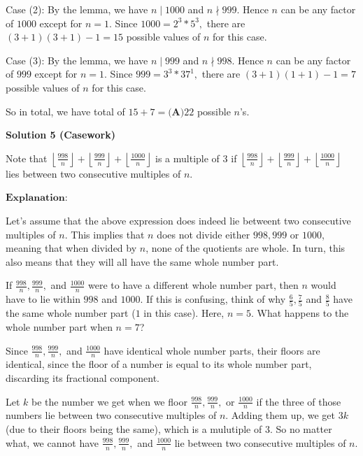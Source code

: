 \begin{enumerate}
 Case (2): By the lemma, we have $n \mid 1000$ and $n \nmid 999.$ Hence $n$ can be any factor of $1000$ except for $n = 1$. Since $1000 = 2^3 * 5^3,$ there are $(3+1)(3+1) - 1 = 15$ possible values of $n$ for this case.

 Case (3): By the lemma, we have $n \mid 999$ and $n \nmid 998.$ Hence $n$ can be any factor of $999$ except for $n = 1$. Since $999 = 3^3 * 37^1,$ there are $(3+1)(1+1) - 1 = 7$ possible values of $n$ for this case.

 So in total, we have total of $15+7=\boxed{\textbf{(A)}22}$ possible $n$'s.

 



\textbf{Solution 5 (Casework)}

Note that $\left\lfloor \frac{998}{n} \right\rfloor + \left\lfloor \frac{999}{n} \right\rfloor + \left\lfloor \frac{1000}{n} \right\rfloor$ is a multiple of $3$ if $\left\lfloor \frac{998}{n} \right\rfloor + \left\lfloor \frac{999}{n} \right\rfloor + \left\lfloor \frac{1000}{n} \right\rfloor$ lies between two consecutive multiples of $n$. 

 
$\textbf{Explanation:}$

 
Let's assume that the above expression does indeed lie betweent two consecutive multiples of $n$. This implies that $n$ does not divide either $998, 999$ or $1000$, meaning that when divided by $n$, none of the quotients are whole. In turn, this also means that they will all have the same whole number part. 

 
If $\frac{998}{n}, \frac{999}{n},$ and $\frac{1000}{n}$ were to have a different whole number part, then $n$ would have to lie within $998$ and $1000$. If this is confusing, think of why $\frac{6}{5}, \frac{7}{5}$ and $\frac{8}{5}$ have the same whole number part ($1$ in this case). Here, $n=5$. What happens to the whole number part when $n=7$? 

 
Since $\frac{998}{n}, \frac{999}{n},$ and $\frac{1000}{n}$ have identical whole number parts, their floors are identical, since the floor of a number is equal to its whole number part, discarding its fractional component. 

 
Let $k$ be the number we get when we floor $\frac{998}{n}, \frac{999}{n},$ or $\frac{1000}{n}$ if the three of those numbers lie between two consecutive multiples of $n$. Adding them up, we get $3k$ (due to their floors being the same), which is a mulutiple of $3$. So no matter what, we cannot have $\frac{998}{n}, \frac{999}{n},$ and $\frac{1000}{n}$ lie between two consecutive multiples of $n$. 


\end{enumerate}
